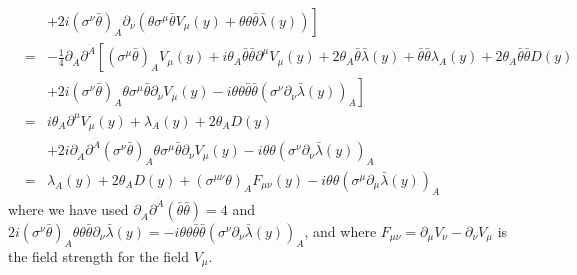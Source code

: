 \documentclass[notes.tex]{subfiles}
\begin{document}
\begin{Answer}
\begin{eqnarray}
&& \left. +2i(\sigma^\nu\bar\theta)_A\partial_\nu \left( \theta\sigma^\mu \bar\theta V_\mu(y) + \theta\theta\bar\theta\bar\lambda(y) \right)
\right] \nonumber\\
&=& -\frac{1}{4} \partial_{\dot A}\partial^{\dot A} \left[
(\sigma^\mu\bar\theta)_AV_\mu(y)+ i\theta_A\bar\theta\bar\theta\partial^\mu V_\mu(y)  + 2\theta_A\bar\theta\bar\lambda(y) + \bar\theta\bar\theta\lambda_A(y) + 2\theta_A\bar\theta\bar\theta D(y) \right. \nonumber\\
&& \left. +2i(\sigma^\nu\bar\theta)_A\theta\sigma^\mu \bar\theta \partial_\nu V_\mu(y) - i\theta\theta\bar\theta\bar\theta(\sigma^\nu\partial_\nu\bar\lambda(y))_A \right] \nonumber\\
&=& i\theta_A\partial^\mu V_\mu(y) +\lambda_A(y) + 2\theta_A D(y) \nonumber\\
&& +2i\partial_{\dot A}\partial^{\dot A}(\sigma^\nu\bar\theta)_A\theta\sigma^\mu \bar\theta \partial_\nu V_\mu(y) - i\theta\theta(\sigma^\nu\partial_\nu\bar\lambda(y))_A \nonumber\\
&=&\lambda_A(y) + 2\theta_A D(y)+(\sigma^{\mu\nu}\theta)_A F_{\mu\nu}(y) - i\theta\theta   (\sigma^\mu \partial_\mu \bar\lambda(y))_A
\end{eqnarray}
where we have used $\partial_{\dot A}\partial^{\dot A}(\bar\theta\bar\theta)=4$ and $2i(\sigma^\nu\bar\theta)_A\theta\theta\bar\theta\partial_\nu\bar\lambda(y)=-i\theta\theta\bar\theta\bar\theta(\sigma^\nu\partial_\nu\bar\lambda(y))_A$, and where $F_{\mu\nu}=\partial_\mu V_\nu-\partial_\nu V_\mu$ is the field strength for the field $V_\mu$.


\end{Answer}
\end{document}
